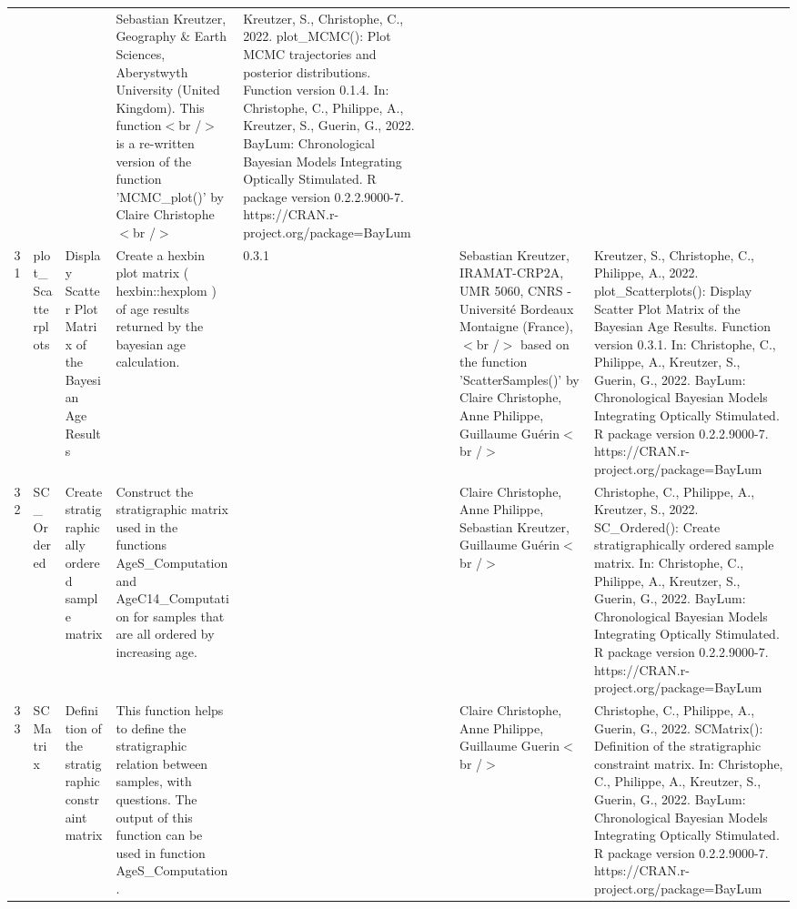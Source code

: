 \begin{table}[ht]
\begin{tabular}{rllllllll}
 &  &  & Sebastian Kreutzer, Geography \& Earth Sciences, Aberystwyth University (United Kingdom). This function$<$br /$>$ is a re-written version of the function 'MCMC\_plot()' by Claire Christophe$<$br /$>$ & Kreutzer, S., Christophe, C., 2022. plot\_MCMC(): Plot MCMC trajectories and posterior distributions. Function version 0.1.4. In: Christophe, C., Philippe, A., Kreutzer, S., Guerin, G., 2022. BayLum: Chronological Bayesian Models Integrating Optically Stimulated. R package version 0.2.2.9000-7. https://CRAN.r-project.org/package=BayLum
 \\ 
  31 & plot\_Scatterplots & Display Scatter Plot Matrix of the Bayesian Age Results & Create a hexbin plot matrix ( hexbin::hexplom ) of age results returned by the bayesian age calculation. & 0.3.1
 &  &  & Sebastian Kreutzer, IRAMAT-CRP2A, UMR 5060, CNRS - Université Bordeaux Montaigne (France),$<$br /$>$ based on the function 'ScatterSamples()' by Claire Christophe, Anne Philippe, Guillaume Guérin$<$br /$>$ & Kreutzer, S., Christophe, C., Philippe, A., 2022. plot\_Scatterplots(): Display Scatter Plot Matrix of the Bayesian Age Results. Function version 0.3.1. In: Christophe, C., Philippe, A., Kreutzer, S., Guerin, G., 2022. BayLum: Chronological Bayesian Models Integrating Optically Stimulated. R package version 0.2.2.9000-7. https://CRAN.r-project.org/package=BayLum
 \\ 
  32 & SC\_Ordered & Create stratigraphically ordered sample matrix & Construct the stratigraphic matrix used in the functions  AgeS\_Computation  and  AgeC14\_Computation  for samples that are all ordered by increasing age. &  &  &  & Claire Christophe, Anne Philippe, Sebastian Kreutzer, Guillaume Guérin$<$br /$>$ & Christophe, C., Philippe, A., Kreutzer, S., 2022. SC\_Ordered(): Create stratigraphically ordered sample matrix. In: Christophe, C., Philippe, A., Kreutzer, S., Guerin, G., 2022. BayLum: Chronological Bayesian Models Integrating Optically Stimulated. R package version 0.2.2.9000-7. https://CRAN.r-project.org/package=BayLum
 \\ 
  33 & SCMatrix & Definition of the stratigraphic constraint matrix & This function helps to define the stratigraphic relation between samples, with questions. The output of this function can be used in function  AgeS\_Computation . &  &  &  & Claire Christophe, Anne Philippe, Guillaume Guerin$<$br /$>$ & Christophe, C., Philippe, A., Guerin, G., 2022. SCMatrix(): Definition of the stratigraphic constraint matrix. In: Christophe, C., Philippe, A., Kreutzer, S., Guerin, G., 2022. BayLum: Chronological Bayesian Models Integrating Optically Stimulated. R package version 0.2.2.9000-7. https://CRAN.r-project.org/package=BayLum

\end{tabular}
\end{table}

